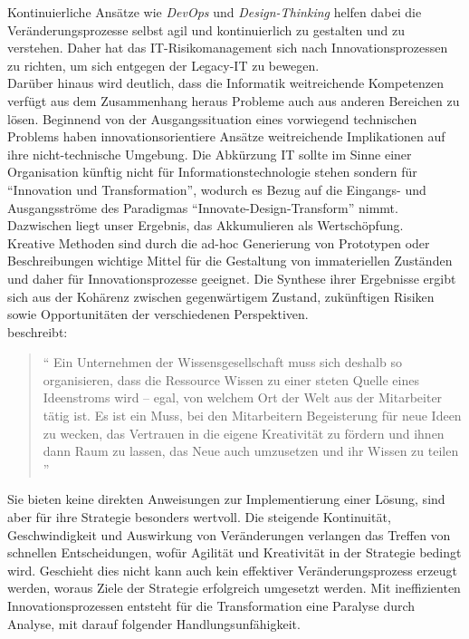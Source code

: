 Kontinuierliche Ansätze wie \emph{DevOps} und \emph{Design-Thinking} helfen dabei die Veränderungsprozesse selbst agil und kontinuierlich zu gestalten und zu verstehen. Daher hat das IT-Risikomanagement sich nach Innovationsprozessen zu richten, um sich entgegen der Legacy-IT zu bewegen.
\medskip
\\
Darüber hinaus wird deutlich, dass die Informatik weitreichende Kompetenzen verfügt aus dem Zusammenhang heraus Probleme auch aus anderen Bereichen zu lösen. Beginnend von der Ausgangssituation eines vorwiegend technischen Problems haben innovationsorientiere Ansätze weitreichende Implikationen auf ihre nicht-technische Umgebung. Die Abkürzung IT sollte im Sinne einer Organisation künftig nicht für Informationstechnologie stehen sondern für \enquote{Innovation und Transformation}, wodurch es Bezug auf die Eingangs- und Ausgangsströme des Paradigmas \enquote{Innovate-Design-Transform} nimmt. Dazwischen liegt unser Ergebnis, das Akkumulieren als Wertschöpfung.
\medskip
\\
Kreative Methoden sind durch die ad-hoc Generierung von Prototypen oder Beschreibungen wichtige Mittel für die Gestaltung von immateriellen Zuständen und daher für Innovationsprozesse geeignet. Die Synthese ihrer Ergebnisse ergibt sich aus der Kohärenz zwischen gegenwärtigem Zustand, zukünftigen Risiken sowie Opportunitäten der verschiedenen Perspektiven. 
\medskip
\\
\citet{Ganswindt2006} beschreibt:
\begin{quote}
    \enquote{
    Ein Unternehmen der Wissensgesellschaft muss sich deshalb so organisieren, dass die Ressource Wissen zu einer steten Quelle eines Ideenstroms wird – egal, von welchem Ort der Welt aus der Mitarbeiter tätig ist. Es ist ein Muss, bei den Mitarbeitern Begeisterung für neue Ideen zu wecken, das Vertrauen in die eigene Kreativität zu fördern und ihnen dann Raum zu lassen, das Neue auch umzusetzen und ihr Wissen zu teilen
    }
\end{quote}
\medskip
Sie bieten keine direkten Anweisungen zur Implementierung einer Lösung, sind aber für ihre Strategie besonders wertvoll. Die steigende Kontinuität, Geschwindigkeit und Auswirkung von Veränderungen verlangen das Treffen von schnellen Entscheidungen, wofür Agilität und Kreativität in der Strategie bedingt wird. Geschieht dies nicht kann auch kein effektiver Veränderungsprozess erzeugt werden, woraus Ziele der Strategie erfolgreich umgesetzt werden. Mit ineffizienten Innovationsprozessen entsteht für die Transformation eine Paralyse durch Analyse, mit darauf folgender Handlungsunfähigkeit. 

